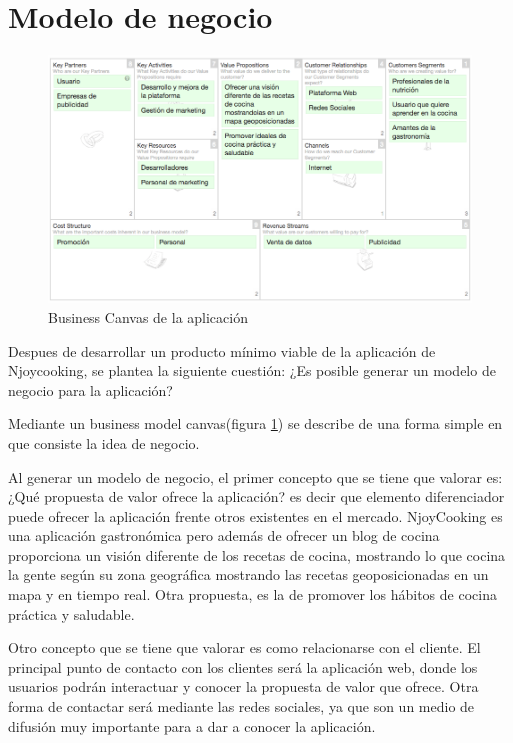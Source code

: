 \section{Modelo de negocio}

\begin{figure}
\begin{center}
\includegraphics[width=1.0\textwidth]{imagenes/business-canvas.png}
\caption{Business Canvas de la aplicación}
\label{business-canvas}
\end{center}
\end{figure}

Despues de desarrollar un producto mínimo viable de la aplicación de Njoycooking, se plantea la siguiente cuestión: ¿Es posible generar un modelo de negocio para la aplicación?

Mediante un business model canvas(figura \ref{business-canvas}) se describe de una forma simple en que consiste la idea de negocio.

\vspace{5 mm}

Al generar un modelo de negocio, el primer concepto que se tiene que valorar es: ¿Qué propuesta de valor ofrece la aplicación? es decir que elemento diferenciador puede ofrecer la aplicación frente otros existentes en el mercado. NjoyCooking es una aplicación gastronómica pero además de ofrecer un blog de cocina proporciona un visión diferente de los recetas de cocina, mostrando lo que cocina la gente según su zona geográfica mostrando las recetas geoposicionadas en un mapa y en tiempo real. Otra propuesta, es la de promover los hábitos de cocina práctica y saludable.


\vspace{5 mm}

Otro concepto que se tiene que valorar es como relacionarse con el cliente. El principal punto de contacto con los clientes será la aplicación web, donde los usuarios podrán interactuar y conocer la propuesta de valor que ofrece. Otra forma de contactar será mediante las redes sociales, ya que son un medio de difusión muy importante para a dar a conocer la aplicación.

